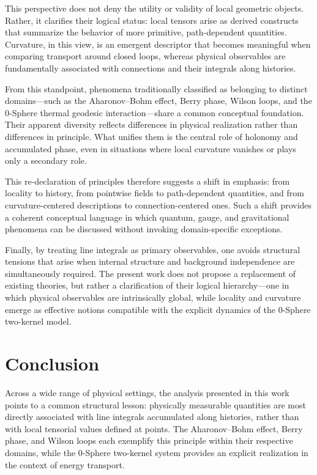 \documentclass[%
 reprint,
 amsmath,amssymb,
 aps,
 prb,
]{revtex4-2}
\numberwithin{equation}{section}
\begin{document}
This perspective does not deny the utility or validity of local geometric objects. Rather, it clarifies their logical status: local tensors arise as derived constructs that summarize the behavior of more primitive, path-dependent quantities. Curvature, in this view, is an emergent descriptor that becomes meaningful when comparing transport around closed loops, whereas physical observables are fundamentally associated with connections and their integrals along histories.

From this standpoint, phenomena traditionally classified as belonging to distinct domains—such as the Aharonov--Bohm effect, Berry phase, Wilson loops, and the 0-Sphere thermal geodesic interaction—share a common conceptual foundation. Their apparent diversity reflects differences in physical realization rather than differences in principle. What unifies them is the central role of holonomy and accumulated phase, even in situations where local curvature vanishes or plays only a secondary role.

This re-declaration of principles therefore suggests a shift in emphasis: from locality to history, from pointwise fields to path-dependent quantities, and from curvature-centered descriptions to connection-centered ones. Such a shift provides a coherent conceptual language in which quantum, gauge, and gravitational phenomena can be discussed without invoking domain-specific exceptions.

Finally, by treating line integrals as primary observables, one avoids structural tensions that arise when internal structure and background independence are simultaneously required. The present work does not propose a replacement of existing theories, but rather a clarification of their logical hierarchy—one in which physical observables are intrinsically global, while locality and curvature emerge as effective notions compatible with the explicit dynamics of the 0-Sphere two-kernel model.


\section{Conclusion}
\label{sec:conclusion}

Across a wide range of physical settings, the analysis presented in this work points to a common structural lesson: physically measurable quantities are most directly associated with line integrals accumulated along histories, rather than with local tensorial values defined at points. The Aharonov--Bohm effect, Berry phase, and Wilson loops each exemplify this principle within their respective domains, while the 0-Sphere two-kernel system provides an explicit realization in the context of energy transport.
\end{document}
